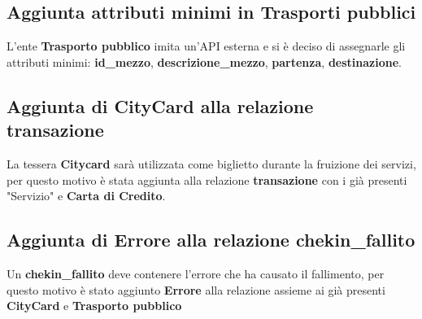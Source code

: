 \subsection{Aggiunta attributi minimi in Trasporti pubblici}
L'ente \textbf{Trasporto pubblico} imita un'API esterna e si è deciso di assegnarle gli attributi minimi: \textbf{id{\_}mezzo}, \textbf{descrizione{\_}mezzo}, \textbf{partenza}, \textbf{destinazione}.

\subsection{Aggiunta di \textbf{CityCard} alla relazione \textbf{transazione}}
La tessera \textbf{Citycard} sarà utilizzata come biglietto durante la fruizione dei servizi, per questo motivo è stata aggiunta alla relazione \textbf{transazione} con i già presenti "Servizio" e \textbf{Carta di Credito}.

\subsection{Aggiunta di \textbf{Errore} alla relazione \textbf{chekin{\_}fallito}}
Un \textbf{chekin{\_}fallito} deve contenere l'errore che ha causato il fallimento, per questo motivo è stato aggiunto \textbf{Errore} alla relazione assieme ai già presenti \textbf{CityCard} e \textbf{Trasporto pubblico}